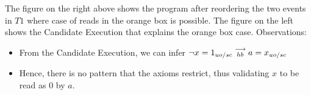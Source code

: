         The figure on the right above shows the program after reordering the two events in $T1$ where case of reads in the orange box is possible. 
        The figure on the left shows the Candidate Execution that explains the orange box case. 
        Observations:
        \begin{itemize}
            \item From the Candidate Execution, we can infer $\neg x=1_{uo/sc}\stackrel{\longrightarrow}{_{hb}}a=x_{uo/sc}$
            \item Hence, there is no pattern that the axioms restrict, thus validating $x$ to be read as $0$ by $a$. 
        \end{itemize}




